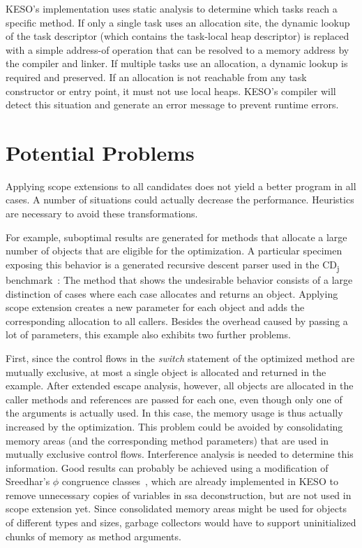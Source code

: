			KESO's implementation uses static analysis to determine which tasks reach a specific method. If only a single task
			uses an allocation site, the dynamic lookup of the task descriptor (which contains the task-local heap descriptor)
			is replaced with a simple address-of operation that can be resolved to a memory address by the compiler and
			linker. If multiple tasks use an allocation, a dynamic lookup is required and preserved. If an allocation is not
			reachable from any task constructor or entry point, it must not use local heaps. KESO's compiler will detect this
			situation and generate an error message to prevent runtime errors.

	\section{Potential Problems}
		\label{sec:eea:probs}
		Applying scope extensions to all candidates does not yield a better program in all cases. A number of situations
		could actually decrease the performance. Heuristics are necessary to avoid these transformations.

		For example, suboptimal results are generated for methods that allocate a large number of objects that are eligible
		for the optimization. A particular specimen exposing this behavior is a generated recursive descent parser used in
		the CD\textsubscript{j} benchmark~\cite{kalibera:09:jtres}: The method that shows the undesirable behavior consists
		of a large distinction of cases where each case allocates and returns an object. Applying scope extension creates
		a new parameter for each object and adds the corresponding allocation to all callers. Besides the overhead caused by
		passing a lot of parameters, this example also exhibits two further problems.

		First, since the control flows in the \emph{switch} statement of the optimized method are mutually exclusive, at
		most a single object is allocated and returned in the example. After extended escape analysis, however, all objects
		are allocated in the caller methods and references are passed for each one, even though only one of the arguments is
		actually used. In this case, the memory usage is thus actually increased by the optimization. This problem could be
		avoided by consolidating memory areas (and the corresponding method parameters) that are used in mutually exclusive
		control flows. Interference analysis is needed to determine this information. Good results can probably be achieved
		using a modification of Sreedhar's $\phi$ congruence classes~\cite{sreedhar:99:sas}, which are already implemented
		in KESO to remove unnecessary copies of variables in \gls{ssa} deconstruction, but are not used in scope extension
		yet. Since consolidated memory areas might be used for objects of different types and sizes, garbage collectors
		would have to support uninitialized chunks of memory as method arguments.

